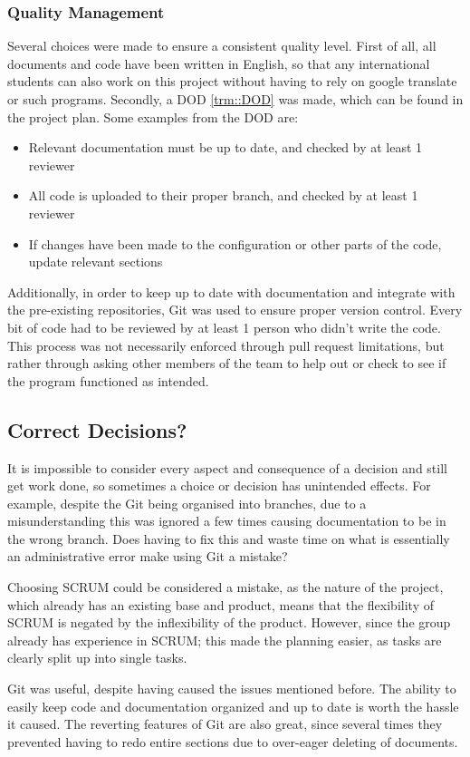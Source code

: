 \subsubsection{Quality Management}
Several choices were made to ensure a consistent quality level.
First of all, all documents and code have been written in English, so that any international students can also work on this project without having to rely on google translate or such programs.
Secondly, a DOD \ref{trm::DOD} was made, which can be found in the project plan.
Some examples from the DOD are:
\begin{itemize}
\item Relevant documentation must be up to date, and checked by at least 1 reviewer
\item All code is uploaded to their proper branch, and checked by at least 1 reviewer
\item If changes have been made to the configuration or other parts of the code, update relevant sections
\end{itemize}
Additionally, in order to keep up to date with documentation and integrate with the pre-existing repositories, Git was used to ensure proper version control.
Every bit of code had to be reviewed by at least 1 person who didn't write the code.
This process was not necessarily enforced through pull request limitations, but rather through asking other members of the team to help out or check to see if the program functioned as intended.

\subsection{Correct Decisions?}
It is impossible to consider every aspect and consequence of a decision and still get work done, so sometimes a choice or decision has unintended effects. 
For example, despite the Git being organised into branches, due to a misunderstanding this was ignored a few times causing documentation to be in the wrong branch.
Does having to fix this and waste time on what is essentially an administrative error make using Git a mistake?

Choosing SCRUM could be considered a mistake, as the nature of the project, which already has an existing base and product, means that the flexibility of SCRUM is negated by the inflexibility of the product.
However, since the group already has experience in SCRUM; this made the planning easier, as tasks are clearly split up into single tasks.

Git was useful, despite having caused the issues mentioned before.
The ability to easily keep code and documentation organized and up to date is worth the hassle it caused.
The reverting features of Git are also great, since several times they prevented having to redo entire sections due to over-eager deleting of documents.

\newpage
